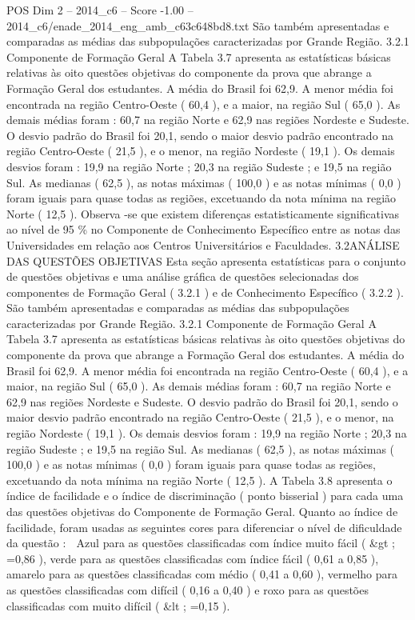 \begin{textsample}{POS Dim 2 – 2014\_c6 – Score -1.00 – 2014\_c6/enade\_2014\_eng\_amb\_c63c648bd8.txt}
São também apresentadas e comparadas as médias das subpopulações caracterizadas por Grande Região. 3.2.1 Componente de Formação Geral A Tabela 3.7 apresenta as estatísticas básicas relativas às oito questões objetivas do componente da prova que abrange a Formação Geral dos estudantes.
A média do Brasil foi 62,9.
A menor média foi encontrada na região Centro-Oeste ( 60,4 ), e a maior, na região Sul ( 65,0 ).
As demais médias foram : 60,7 na região Norte e 62,9 nas regiões Nordeste e Sudeste.
O desvio padrão do Brasil foi 20,1, sendo o maior desvio padrão encontrado na região Centro-Oeste ( 21,5 ), e o menor, na região Nordeste ( 19,1 ).
Os demais desvios foram : 19,9 na região Norte ; 20,3 na região Sudeste ; e 19,5 na região Sul.
As medianas ( 62,5 ), as notas máximas ( 100,0 ) e as notas mínimas ( 0,0 ) foram iguais para quase todas as regiões, excetuando da nota mínima na região Norte ( 12,5 ).
Observa -se que existem diferenças estatisticamente significativas ao nível de 95 \% no Componente de Conhecimento Específico entre as notas das Universidades em relação aos Centros Universitários e Faculdades. 3.2ANÁLISE DAS QUESTÕES OBJETIVAS Esta seção apresenta estatísticas para o conjunto de questões objetivas e uma análise gráfica de questões selecionadas dos componentes de Formação Geral ( 3.2.1 ) e de Conhecimento Específico ( 3.2.2 ).
São também apresentadas e comparadas as médias das subpopulações caracterizadas por Grande Região. 3.2.1 Componente de Formação Geral A Tabela 3.7 apresenta as estatísticas básicas relativas às oito questões objetivas do componente da prova que abrange a Formação Geral dos estudantes.
A média do Brasil foi 62,9.
A menor média foi encontrada na região Centro-Oeste ( 60,4 ), e a maior, na região Sul ( 65,0 ).
As demais médias foram : 60,7 na região Norte e 62,9 nas regiões Nordeste e Sudeste.
O desvio padrão do Brasil foi 20,1, sendo o maior desvio padrão encontrado na região Centro-Oeste ( 21,5 ), e o menor, na região Nordeste ( 19,1 ).
Os demais desvios foram : 19,9 na região Norte ; 20,3 na região Sudeste ; e 19,5 na região Sul.
As medianas ( 62,5 ), as notas máximas ( 100,0 ) e as notas mínimas ( 0,0 ) foram iguais para quase todas as regiões, excetuando da nota mínima na região Norte ( 12,5 ).
A Tabela 3.8 apresenta o índice de facilidade e o índice de discriminação ( ponto bisserial ) para cada uma das questões objetivas do Componente de Formação Geral.
Quanto ao índice de facilidade, foram usadas as seguintes cores para diferenciar o nível de dificuldade da questão :  Azul para as questões classificadas com índice muito fácil ( \&gt ; =0,86 ), verde para as questões classificadas com índice fácil ( 0,61 a 0,85 ), amarelo para as questões classificadas com médio ( 0,41 a 0,60 ), vermelho para as questões classificadas com difícil ( 0,16 a 0,40 ) e roxo para as questões classificadas com muito difícil ( \&lt ; =0,15 ).

\end{textsample}
